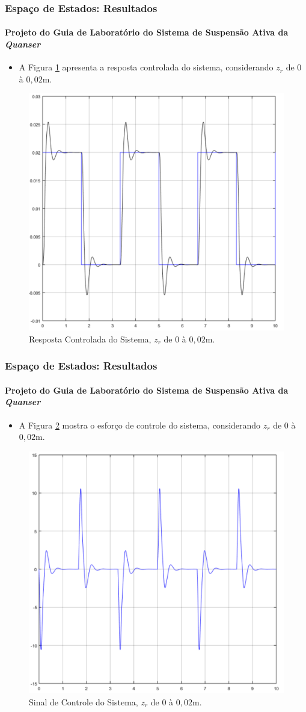 \documentclass{beamer}
\begin{document}
\begin{frame}
\frametitle{Espaço de Estados: Resultados}
\framesubtitle{Projeto do Guia de Laboratório do Sistema de Suspensão Ativa da \protect\textit{Quanser}}
\begin{itemize}
\item A Figura \ref{quanserEE} apresenta a resposta controlada do sistema, considerando $z_r$ de $0$ à $0,02$m.
\end{itemize}
\begin{figure}[H]
	\centering
\includegraphics[width=.45\columnwidth]{./imagens/quanserEE.pdf}
    \renewcommand{\figurename}{Fig. 21}
    \caption{Resposta Controlada do Sistema, $z_r$ de $0$ à $0,02$m.}
	\label{quanserEE}
\end{figure}
\end{frame}

\begin{frame}
\frametitle{Espaço de Estados: Resultados}
\framesubtitle{Projeto do Guia de Laboratório do Sistema de Suspensão Ativa da \protect\textit{Quanser}}
\begin{itemize}
\item A Figura \ref{quanserEE2} mostra o esforço de controle do sistema, considerando $z_r$ de $0$ à $0,02$m.
\end{itemize}
\begin{figure}[H]
	\centering
\includegraphics[width=.45\columnwidth]{./imagens/quanserEE2.pdf}
    \renewcommand{\figurename}{Fig. 22}
    \caption{Sinal de Controle do Sistema, $z_r$ de $0$ à $0,02$m.}
	\label{quanserEE2}
\end{figure}
\end{frame}
\end{document}
